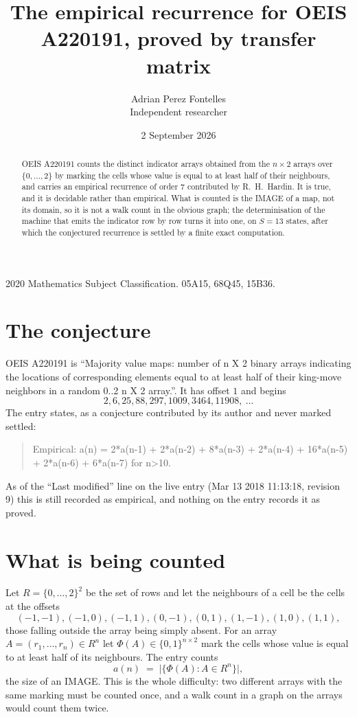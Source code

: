\documentclass[11pt,a4paper]{article}
\title{The empirical recurrence for OEIS A220191, proved by transfer matrix}
\author{Adrian Perez Fontelles\\ \small Independent researcher}
\date{2 September 2026}
\theoremstyle{plain}
\theoremstyle{definition}
\begin{document}
\maketitle

\begin{abstract}
OEIS A220191 counts the distinct indicator arrays obtained from the $n\times2$ arrays over
$\{0,\dots,2\}$ by marking the cells whose value is equal to at least half of their neighbours, and carries an
empirical recurrence of order $7$ contributed by R.~H.~Hardin. It is true, and it is
decidable rather than empirical. What is counted is the IMAGE of a map, not its domain, so it
is not a walk count in the obvious graph; the determinisation of the machine that emits the
indicator row by row turns it into one, on $S=13$ states, after which the conjectured
recurrence is settled by a finite exact computation.
\end{abstract}

\noindent\small 2020 Mathematics Subject Classification. 05A15, 68Q45, 15B36.\normalsize

\section{The conjecture}

OEIS A220191 is ``Majority value maps: number of n X 2 binary arrays indicating the locations of corresponding elements equal to at least half of their king-move neighbors in a random 0..2 n X 2 array.''. It has offset $1$ and begins
\[
2, 6, 25, 88, 297, 1009, 3464, 11908,\ \dots
\]
The entry states, as a conjecture contributed by its author and never marked settled:
\begin{quote}
Empirical: a(n) = 2*a(n-1) + 2*a(n-2) + 8*a(n-3) + 2*a(n-4) + 16*a(n-5) + 2*a(n-6) + 6*a(n-7) for n>10.
\end{quote}
As of the ``Last modified'' line on the live entry (Mar 13 2018 11:13:18, revision 9) this is still
recorded as empirical, and nothing on the entry records it as proved.

\section{What is being counted}

Let $R=\{0,\dots,2\}^{2}$ be the set of rows and let the neighbours of a cell be the
cells at the offsets
\[
(-1,-1), (-1,0), (-1,1), (0,-1), (0,1), (1,-1), (1,0), (1,1),
\]
those falling outside the array being simply absent. For an array
$A=(r_1,\dots,r_n)\in R^n$ let $\Phi(A)\in\{0,1\}^{n\times2}$ mark the cells whose value
is equal to at least half of its neighbours. The entry counts
\[
a(n)\;=\;\bigl|\{\Phi(A):A\in R^n\}\bigr| ,
\]
the size of an IMAGE. This is the whole difficulty: two different arrays with the same marking
must be counted once, and a walk count in a graph on the arrays would count them twice.
\end{document}
